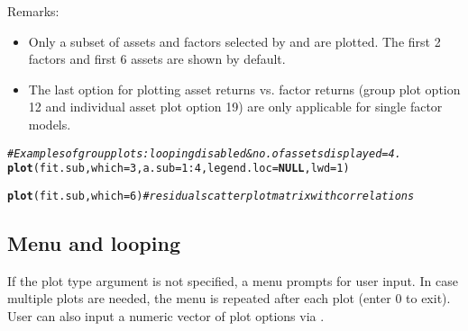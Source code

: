 \documentclass[a4paper]{article}\usepackage[]{graphicx}\usepackage[]{color}
\makeatletter
\newcommand{\hlnum}[1]{\textcolor[rgb]{0.686,0.059,0.569}{#1}}%
\newcommand{\hlcom}[1]{\textcolor[rgb]{0.678,0.584,0.686}{\textit{#1}}}%
\newcommand{\hlopt}[1]{\textcolor[rgb]{0,0,0}{#1}}%
\newcommand{\hlstd}[1]{\textcolor[rgb]{0.345,0.345,0.345}{#1}}%
\newcommand{\hlkwa}[1]{\textcolor[rgb]{0.161,0.373,0.58}{\textbf{#1}}}%
\newcommand{\hlkwc}[1]{\textcolor[rgb]{0.333,0.667,0.333}{#1}}%
\newcommand{\hlkwd}[1]{\textcolor[rgb]{0.737,0.353,0.396}{\textbf{#1}}}%
\newenvironment{kframe}{%
 \def\at@end@of@kframe{}%
 \ifinner\ifhmode%
  \def\at@end@of@kframe{\end{minipage}}%
  \begin{minipage}{\columnwidth}%
 \fi\fi%
 \def\FrameCommand##1{\hskip\@totalleftmargin \hskip-\fboxsep
 \colorbox{shadecolor}{##1}\hskip-\fboxsep
     \hskip-\linewidth \hskip-\@totalleftmargin \hskip\columnwidth}%
 \MakeFramed {\advance\hsize-\width
   \@totalleftmargin\z@ \linewidth\hsize
   \@setminipage}}%
 {\par\unskip\endMakeFramed%
 \at@end@of@kframe}
\newenvironment{knitrout}{}{} %
\makeatother
\begin{document}
Remarks:
\begin{itemize}
\item Only a subset of assets and factors selected by  and  are plotted. The first 2 factors and first 6 assets are shown by default.
\item The last option for plotting asset returns vs. factor returns (group plot option 12 and individual asset plot option 19) are only applicable for single factor models.
\end{itemize}

\begin{knitrout}
\color{fgcolor}\begin{kframe}
\begin{alltt}
\hlcom{# Examples of group plots: looping disabled & no. of assets displayed = 4.}
\hlkwd{plot}\hlstd{(fit.sub,} \hlkwc{which}\hlstd{=}\hlnum{3}\hlstd{,} \hlkwc{a.sub}\hlstd{=}\hlnum{1}\hlopt{:}\hlnum{4}\hlstd{,} \hlkwc{legend.loc}\hlstd{=}\hlkwa{NULL}\hlstd{,} \hlkwc{lwd}\hlstd{=}\hlnum{1}\hlstd{)}
\end{alltt}


{\ttfamily\noindent\bfseries\color{errorcolor}{\#\# Error in plot(fit.sub, which = 3, a.sub = 1:4, legend.loc = NULL, lwd = 1): object 'fit.sub' not found}}\end{kframe}
\end{knitrout}

\begin{knitrout}
\color{fgcolor}\begin{kframe}
\begin{alltt}
\hlkwd{plot}\hlstd{(fit.sub,} \hlkwc{which}\hlstd{=}\hlnum{6}\hlstd{)} \hlcom{# residual scatter plot matrix with correlations}
\end{alltt}


{\ttfamily\noindent\bfseries\color{errorcolor}{\#\# Error in plot(fit.sub, which = 6): object 'fit.sub' not found}}\end{kframe}
\end{knitrout}

\subsection{Menu and looping}

If the plot type argument  is not specified, a menu prompts for user input. In case multiple plots are needed, the menu is repeated after each plot (enter 0 to exit). User can also input a numeric vector of plot options via .
\end{document}

